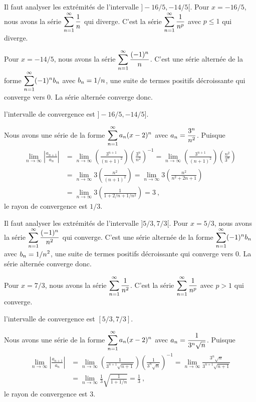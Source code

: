 {Il faut analyser les extrémités de l'intervalle
$]-16/5, -14/5[$.  Pour $x=-16/5$, nous avons la série
$\displaystyle \sum_{n=1}^\infty \frac{1}{n}$ qui diverge.  C'est la
série $\displaystyle \sum_{n=1}^\infty \frac{1}{n^p}$ avec
$p \leq 1$ qui diverge.

Pour $x=-14/5$, nous avons la série
$\displaystyle \sum_{n=1}^\infty \frac{(-1)^n}{n}$.  C'est une série
alternée de la forme $\displaystyle \sum_{n=1}^\infty (-1)^n b_n$
avec $\displaystyle b_n = 1/n$, une suite de termes
positifs décroissante qui converge vers $0$.  La
série alternée converge donc.

l'intervalle de convergence est $]-16/5, -14/5]$.

 Nous avons une série de la forme
$\displaystyle \sum_{n=1}^\infty a_n (x-2)^n$ avec
$\displaystyle a_n = \frac{3^n}{n^2}$.  Puisque
\begin{align*}
\lim_{n\to \infty} \left|\frac{a_{n+1}}{a_n}\right|
&= \lim_{n\to \infty} \left( \frac{3^{n+1}}{(n+1)^2}\right)
\left( \frac{3^n}{n^2}\right)^{-1}
= \lim_{n\to \infty} \left( \frac{3^{n+1}}{(n+1)^2}\right)
\left( \frac{n^2}{3^n}\right) \\
&= \lim_{n\to \infty} 3\left( \frac{n^2}{(n+1)^2}\right)
= \lim_{n\to \infty} 3\left( \frac{n^2}{n^2+2n +1}\right) \\
&= \lim_{n\to \infty} 3\left( \frac{1}{1+2/n +1/n^2}\right)
= 3 \ ,
\end{align*}
le rayon de convergence est $1/3$.

Il faut analyser les extrémités de l'intervalle
$]5/3, 7/3[$.  Pour $x=5/3$, nous avons la série
$\displaystyle \sum_{n=1}^\infty \frac{(-1)^n}{n^2}$ qui converge.
C'est une série alternée de la forme
$\displaystyle \sum_{n=1}^\infty (-1)^n b_n$
avec $\displaystyle b_n = 1/n^2$, une suite de termes
positifs décroissante qui converge vers $0$.  La
série alternée converge donc.

Pour $x=7/3$, nous avons la série
$\displaystyle \sum_{n=1}^\infty \frac{1}{n^2}$.  C'est la
série $\displaystyle \sum_{n=1}^\infty \frac{1}{n^p}$ avec
$p > 1$ qui converge.

l'intervalle de convergence est $[5/3, 7/3]$.

 Nous avons une série de la forme
$\displaystyle \sum_{n=1}^\infty a_n (x-2)^n$ avec
$\displaystyle a_n = \frac{1}{3^n\sqrt{n}}$.  Puisque
\begin{align*}
\lim_{n\to \infty} \left|\frac{a_{n+1}}{a_n}\right|
&= \lim_{n\to \infty} \left( \frac{1}{3^{n+1}\sqrt{n+1}}\right)
\left( \frac{1}{3^n\sqrt{n}}\right)^{-1}
= \lim_{n\to \infty} \frac{3^n\sqrt{n}}{3^{n+1}\sqrt{n+1}} \\
&= \lim_{n\to \infty} \frac{1}{3} \sqrt{\frac{1}{1+ 1/n}}
= \frac{1}{3} \ ,
\end{align*}
le rayon de convergence est $3$.

}
